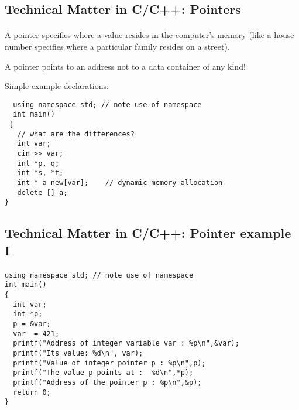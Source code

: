 \documentclass[%
oneside,                 %
final,                   %
10pt]{article}
\begin{document}
\noindent



\subsection*{Technical Matter in C/C++: Pointers}


\paragraph{}
A pointer specifies where a value resides in the computer's memory (like a house number specifies where a particular family resides on a street).

A pointer points to an address not to a data container of any kind!

Simple example declarations:

\begin{verbatim}
  using namespace std; // note use of namespace
  int main()
 {
   // what are the differences?
   int var;
   cin >> var;
   int *p, q;
   int *s, *t;
   int * a new[var];    // dynamic memory allocation
   delete [] a;
}
\end{verbatim}



\subsection*{Technical Matter in C/C++: Pointer example I}


\paragraph{}
\begin{verbatim}
using namespace std; // note use of namespace
int main()
{
  int var;
  int *p;
  p = &var;
  var  = 421;
  printf("Address of integer variable var : %p\n",&var);
  printf("Its value: %d\n", var);
  printf("Value of integer pointer p : %p\n",p);
  printf("The value p points at :  %d\n",*p);
  printf("Address of the pointer p : %p\n",&p);
  return 0;
}
\end{verbatim}
\end{document}
